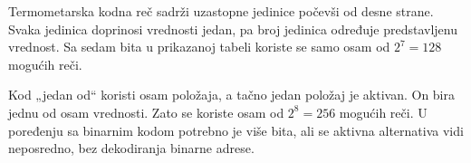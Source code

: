 Termometarska kodna reč sadrži uzastopne jedinice počevši od desne strane. Svaka jedinica doprinosi vrednosti jedan, pa broj jedinica određuje predstavljenu vrednost. Sa sedam bita u prikazanoj tabeli koriste se samo osam od $2^7=128$ mogućih reči.

Kod „jedan od“ koristi osam položaja, a tačno jedan položaj je aktivan. On bira jednu od osam vrednosti. Zato se koriste osam od $2^8=256$ mogućih reči. U poređenju sa binarnim kodom potrebno je više bita, ali se aktivna alternativa vidi neposredno, bez dekodiranja binarne adrese.
